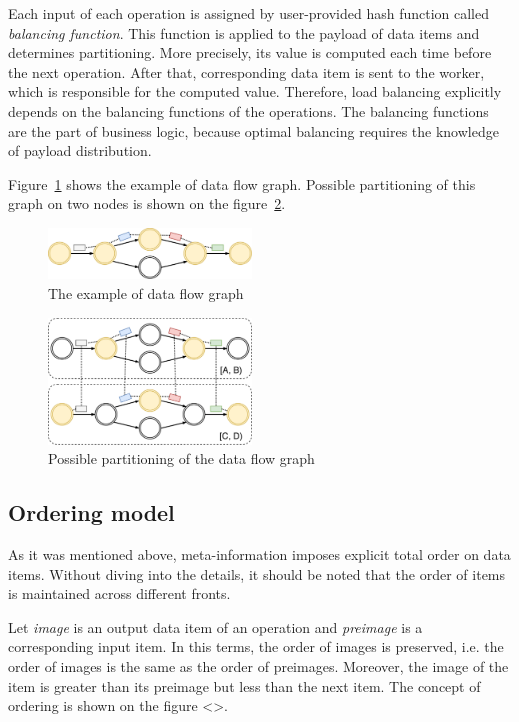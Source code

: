 Each input of each operation is assigned by user-provided hash function called {\it balancing function}. This function is applied to the payload of data items and determines partitioning. More precisely, its value is computed each time before the next operation. After that, corresponding data item is sent to the worker, which is responsible for the computed value. Therefore, load balancing explicitly depends on the balancing functions of the operations. The balancing functions are the part of business logic, because optimal balancing requires the knowledge of payload distribution.

Figure~\ref{logical-graph-figure} shows the example of data flow graph. Possible partitioning of this graph on two nodes is shown on the figure~\ref{physical-graph-figure}.

\begin{figure}[htbp]
  \centering
  \includegraphics[width=0.48\textwidth]{pics/logical-graph}
  \caption{The example of data flow graph}
  \label {logical-graph-figure}
\end{figure}

\begin{figure}[htbp]
  \centering
  \includegraphics[width=0.48\textwidth]{pics/physical-graph}
  \caption{Possible partitioning of the data flow graph}
  \label {physical-graph-figure}
\end{figure}

\subsection{Ordering model}

As it was mentioned above, meta-information imposes explicit total order on data items. Without diving into the details, it should be noted that the order of items is maintained across different fronts.

Let {\it image} is an output data item of an operation and {\it preimage} is a corresponding input item. In this terms, the order of images is preserved, i.e. the order of images is the same as the order of preimages. Moreover, the image of the item is greater than its preimage but less than the next item. The concept of ordering is shown on the figure <>.

